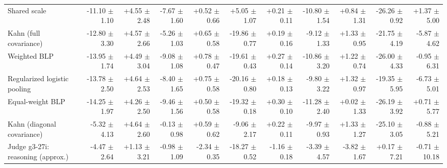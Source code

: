 \begin{tabular}{lrrrrrrrrrr}
Shared scale & -11.10 {\scriptsize $\pm$ 1.10} & +4.55 {\scriptsize $\pm$ 2.48} & -7.67 {\scriptsize $\pm$ 1.60} & +0.52 {\scriptsize $\pm$ 0.66} & +5.05 {\scriptsize $\pm$ 1.07} & +0.21 {\scriptsize $\pm$ 0.11} & -10.80 {\scriptsize $\pm$ 1.54} & +0.84 {\scriptsize $\pm$ 1.31} & -26.26 {\scriptsize $\pm$ 0.92} & +1.37 {\scriptsize $\pm$ 5.00} \\
Kahn (full covariance) & -12.80 {\scriptsize $\pm$ 3.30} & +4.57 {\scriptsize $\pm$ 2.66} & -5.26 {\scriptsize $\pm$ 1.03} & +0.65 {\scriptsize $\pm$ 0.58} & -19.86 {\scriptsize $\pm$ 0.77} & +0.19 {\scriptsize $\pm$ 0.16} & -9.12 {\scriptsize $\pm$ 1.33} & +1.33 {\scriptsize $\pm$ 0.95} & -21.75 {\scriptsize $\pm$ 4.19} & -5.87 {\scriptsize $\pm$ 4.62} \\
Weighted BLP & -13.95 {\scriptsize $\pm$ 1.74} & +4.49 {\scriptsize $\pm$ 3.04} & -9.08 {\scriptsize $\pm$ 1.08} & +0.78 {\scriptsize $\pm$ 0.47} & -19.61 {\scriptsize $\pm$ 0.43} & +0.27 {\scriptsize $\pm$ 0.14} & -10.86 {\scriptsize $\pm$ 3.20} & +1.22 {\scriptsize $\pm$ 0.74} & -26.00 {\scriptsize $\pm$ 4.33} & -0.95 {\scriptsize $\pm$ 6.31} \\
Regularized logistic pooling & -13.78 {\scriptsize $\pm$ 2.50} & +4.64 {\scriptsize $\pm$ 2.53} & -8.40 {\scriptsize $\pm$ 1.65} & +0.75 {\scriptsize $\pm$ 0.58} & -20.16 {\scriptsize $\pm$ 0.80} & +0.18 {\scriptsize $\pm$ 0.13} & -9.80 {\scriptsize $\pm$ 3.22} & +1.32 {\scriptsize $\pm$ 0.97} & -19.35 {\scriptsize $\pm$ 5.95} & -6.73 {\scriptsize $\pm$ 5.01} \\
Equal-weight BLP & -14.25 {\scriptsize $\pm$ 1.97} & +4.26 {\scriptsize $\pm$ 2.50} & -9.46 {\scriptsize $\pm$ 1.56} & +0.50 {\scriptsize $\pm$ 0.58} & -19.32 {\scriptsize $\pm$ 0.18} & +0.30 {\scriptsize $\pm$ 0.10} & -11.28 {\scriptsize $\pm$ 2.40} & +0.02 {\scriptsize $\pm$ 1.33} & -26.19 {\scriptsize $\pm$ 3.92} & +0.71 {\scriptsize $\pm$ 5.77} \\
Kahn (diagonal covariance) & -5.32 {\scriptsize $\pm$ 4.13} & +4.64 {\scriptsize $\pm$ 2.60} & -0.13 {\scriptsize $\pm$ 0.98} & +0.59 {\scriptsize $\pm$ 0.62} & -9.06 {\scriptsize $\pm$ 2.17} & +0.22 {\scriptsize $\pm$ 0.11} & -9.97 {\scriptsize $\pm$ 0.93} & +1.33 {\scriptsize $\pm$ 1.27} & -25.10 {\scriptsize $\pm$ 3.05} & -0.88 {\scriptsize $\pm$ 5.21} \\
Judge g3-27i: reasoning (approx.) & -4.47 {\scriptsize $\pm$ 2.64} & +1.13 {\scriptsize $\pm$ 3.21} & -0.98 {\scriptsize $\pm$ 1.09} & -2.34 {\scriptsize $\pm$ 0.35} & -18.27 {\scriptsize $\pm$ 0.52} & -1.16 {\scriptsize $\pm$ 0.18} & -3.39 {\scriptsize $\pm$ 4.57} & -3.82 {\scriptsize $\pm$ 1.67} & +0.17 {\scriptsize $\pm$ 7.21} & -0.71 {\scriptsize $\pm$ 10.18} \\

\end{tabular}
